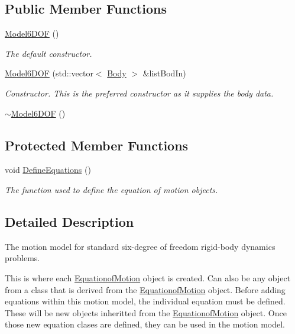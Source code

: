 \subsection*{Public Member Functions}
\begin{DoxyCompactItemize}
\item 
\hyperlink{classosea_1_1ofreq_1_1_model6_d_o_f_a12492ff1097aa30bb6e1e700b56387c3}{Model6\-D\-O\-F} ()
\begin{DoxyCompactList}\small\item\em The default constructor. \end{DoxyCompactList}\item 
\hyperlink{classosea_1_1ofreq_1_1_model6_d_o_f_ad86b5d762a92454bb3be07a6e125c9c5}{Model6\-D\-O\-F} (std\-::vector$<$ \hyperlink{classosea_1_1ofreq_1_1_body}{Body} $>$ \&list\-Bod\-In)
\begin{DoxyCompactList}\small\item\em Constructor. This is the preferred constructor as it supplies the body data. \end{DoxyCompactList}\item 
\hyperlink{classosea_1_1ofreq_1_1_model6_d_o_f_a9559d74006712422d84356e210b406be}{$\sim$\-Model6\-D\-O\-F} ()
\end{DoxyCompactItemize}
\subsection*{Protected Member Functions}
\begin{DoxyCompactItemize}
\item 
void \hyperlink{classosea_1_1ofreq_1_1_model6_d_o_f_a0048de3d40838c93e2130ebb5130f3a1}{Define\-Equations} ()
\begin{DoxyCompactList}\small\item\em The function used to define the equation of motion objects. \end{DoxyCompactList}\end{DoxyCompactItemize}


\subsection{Detailed Description}
The motion model for standard six-\/degree of freedom rigid-\/body dynamics problems. 





This is where each \hyperlink{classosea_1_1ofreq_1_1_equationof_motion}{Equationof\-Motion} object is created. Can also be any object from a class that is derived from the \hyperlink{classosea_1_1ofreq_1_1_equationof_motion}{Equationof\-Motion} object. Before adding equations within this motion model, the individual equation must be defined. These will be new objects inheritted from the \hyperlink{classosea_1_1ofreq_1_1_equationof_motion}{Equationof\-Motion} object. Once those new equation clases are defined, they can be used in the motion model.

